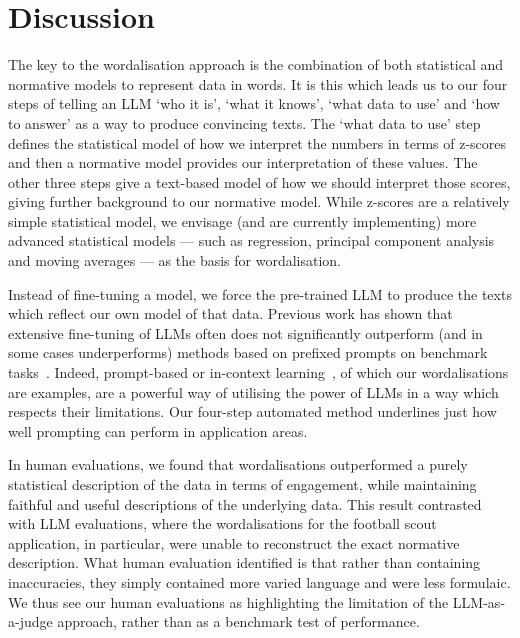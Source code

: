 \documentclass{article}
\begin{document}
\section{Discussion}

The key to the wordalisation approach is the combination of both statistical and normative models to represent data in words. It is this which leads us to our four steps of telling an LLM `who it is', `what it knows', `what data to use' and `how to answer' as a way to produce convincing texts. The `what data to use' step defines the statistical model of how we interpret the numbers in terms of z-scores and then a normative model provides our interpretation of these values. The other three steps give a text-based model of how we should interpret those scores, giving further background to our normative model. While z-scores are a relatively simple statistical model, we envisage (and are currently implementing) more advanced statistical models --- such as regression, principal component analysis and moving averages --- as the basis for wordalisation. 

Instead of fine-tuning a model, we force the pre-trained LLM to produce the texts which reflect our own model of that data. Previous work has shown that extensive fine-tuning of LLMs often does not significantly outperform (and in some cases underperforms) methods based on prefixed prompts on benchmark tasks~\cite{li2021prefix,jia2022visual}. Indeed, prompt-based or in-context learning~\cite{radford2019language,liu2023pre,brown2020language}, of which our wordalisations are examples, are a powerful way of utilising the power of LLMs in a way which respects their limitations. Our four-step automated method underlines just how well prompting can perform in application areas.

In human evaluations, we found that wordalisations outperformed a purely statistical description of the data in terms of engagement, while maintaining faithful and useful descriptions of the underlying data. This result contrasted with LLM evaluations, where the wordalisations for the football scout application, in particular, were unable to reconstruct the exact normative description. What human evaluation identified is that rather than containing inaccuracies, they simply  contained more varied language and were less formulaic. We thus see our human evaluations as highlighting the limitation of the LLM-as-a-judge approach, rather than as a benchmark test of performance. 
\end{document}
